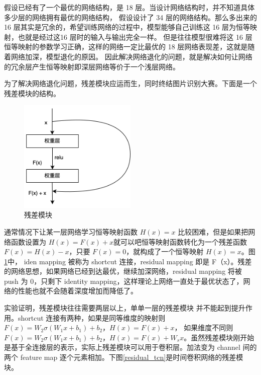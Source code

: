 假设已经有了一个最优的网络结构，是 18 层。当设计网络结构时，并不知道具体多少层的网络拥有最优的网络结构，
假设设计了 34 层的网络结构。那么多出来的 16 层其实是冗余的，希望训练网络的过程中，模型能够自己训练这 16 层为恒等映射，也就是经过这16 层时的输入与输出完全一样。
但是往往模型很难将这 16 层恒等映射的参数学习正确，这样的网络一定比最优的 18 层网络表现差，这就是随着网络加深，模型退化的原因。
因此解决网络退化的问题，就是解决如何让网络的冗余层产生恒等映射即深层网络等价于一个浅层网络。

为了解决网络退化问题，残差模块应运而生，同时终结图片识别大赛。下面是一个残差模块的结构。

\begin{figure}[htbp]
  \centering
  \includegraphics[width=0.5\textwidth]{figures/residual_block.png}
  \caption{残差模块}
  \label{residual_block}
\end{figure}

通常情况下让某一层网络学习恒等映射函数 $H(x) = x$ 比较困难，但是如果把网络函数设置为 $H(x) = F(x) + x$就可以吧恒等映射函数转化为一个残差函数 $F(x) = H(x) - x$，只要 $F(x) = 0$，就构成了一个恒等映射 $H(x) = x$。图\ref{residual_block}中，
iden mapping 被称为 shortcut 连接，residual mapping 即是 F（x）。残差的网络思想，如果网络已经到达最优，继续加深网络，residual mapping 将被 push 为 0，只剩下 identity mapping，这样理论上网络一直处于最优状态了，网络的性能也就不会随着深度增加而降低了。

实验证明，残差模块往往需要两层以上，单单一层的残差模块 并不能起到提升作用\cite{he2016deep}。shortcut 连接有两种，如果是同等维度的映射则 $F(x)=W_2σ(W_1x+b_1)+b_2，H(x)=F(x)+x$，
如果维度不同则 $F(x)=W_2σ(W_1x+b_1)+b_2，H(x)=F(x)+W_sx$。虽然残差模块刚开始是基于全连接层的表示，实际上残差模块可以用于卷积层。加法变为 channel 间的两个 feature map 逐个元素相加。下图\ref{residual_tcn}是时间卷积网络的残差模块。

